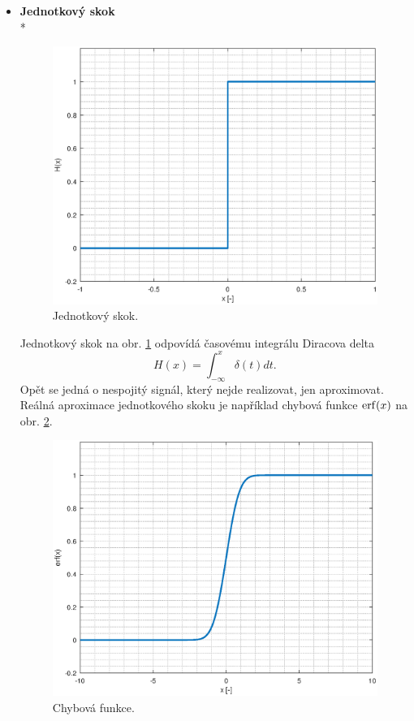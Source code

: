 \begin{itemize}
	\item
	\textbf{Jednotkový skok}\\*
	\begin{figure}[htbp]\includegraphics[width=\textwidth,keepaspectratio]{images/unitstep.eps}\caption{Jednotkový skok.}\label{unitstep}\end{figure}		
	Jednotkový skok na obr. \ref{unitstep} odpovídá časovému integrálu Diracova delta
	\begin{equation}
		H(x)=\int_{-\infty}^x \delta(t) dt.
	\end{equation} Opět se jedná o nespojitý signál, který nejde realizovat, jen aproximovat. Reálná aproximace jednotkového skoku je například chybová funkce $\erf(x)$ na obr. \ref{errorfunction}.
	
	\begin{figure}[htbp]\includegraphics[width=\textwidth,keepaspectratio]{images/erf.eps}\caption{Chybová funkce.}\label{errorfunction}\end{figure}		
		

\end{itemize}
